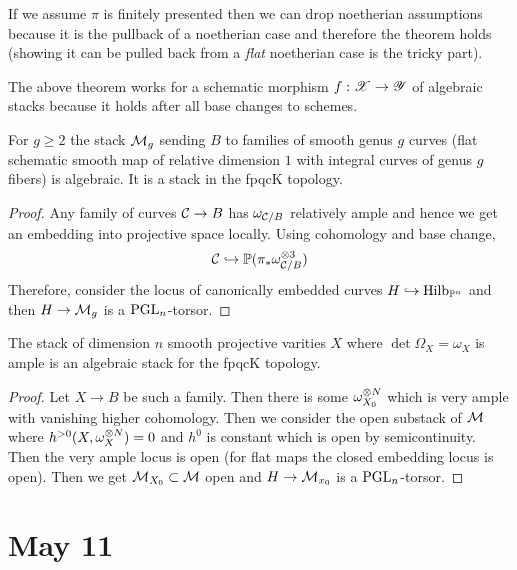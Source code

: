 \documentclass[12pt]{article}
\begin{document}
\begin{rmk}
If we assume $\pi$ is finitely presented then we can drop noetherian assumptions because it is the pullback of a noetherian case and therefore the theorem holds (showing it can be pulled back from a \textit{flat} noetherian case is the tricky part). 
\end{rmk}

\newcommand{\Y}{\mathscr{Y}}

\begin{rmk}
The above theorem works for a schematic morphism $f : \X \to \Y$ of algebraic stacks because it holds after all base changes to schemes. 
\end{rmk}

\begin{prop}
For $g \ge 2$ the stack $\mathcal{M}_g$ sending $B$ to families of smooth genus $g$ curves (flat schematic smooth map of relative dimension $1$ with integral curves of genus $g$ fibers) is algebraic. It is a stack in the fpqcK topology. 
\end{prop}

\begin{proof}
Any family of curves $\mathcal{C} \to B$ has $\omega_{\mathcal{C} / B}$ relatively ample and hence we get an embedding into projective space locally. Using cohomology and base change,
\[ \mathcal{C} \hookrightarrow \mathbb{P}(\pi_* \omega_{\mathcal{C}/B}^{\otimes 3}) \]
Therefore, consider the locus of canonically embedded curves $H \hookrightarrow \mathrm{Hilb}_{\mathbb{P}^n}$ and then $H \to \mathcal{M}_g$ is a $\mathrm{PGL}_n$-torsor.  
\end{proof}

\begin{prop}
The stack of dimension $n$ smooth projective varities $X$ where $\det{\Omega_X} = \omega_X$ is ample is an algebraic stack for the fpqcK topology.
\end{prop}

\begin{proof}
Let $X \to B$ be such a family. Then there is some $\omega_{X_0}^{\otimes N}$ which is very ample with vanishing higher cohomology. Then we consider the open substack of $\mathcal{M}$ where $h^{>0}(X, \omega_X^{\otimes N}) = 0$ and $h^0$ is constant which is open by semicontinuity. Then the very ample locus is open (for flat maps the closed embedding locus is open). Then we get $\mathcal{M}_{X_0} \subset \mathcal{M}$ open and $H \to \mathcal{M}_{x_0}$ is a $\mathrm{PGL}_n$-torsor. 
\end{proof}

\section{May 11}
\end{document}
